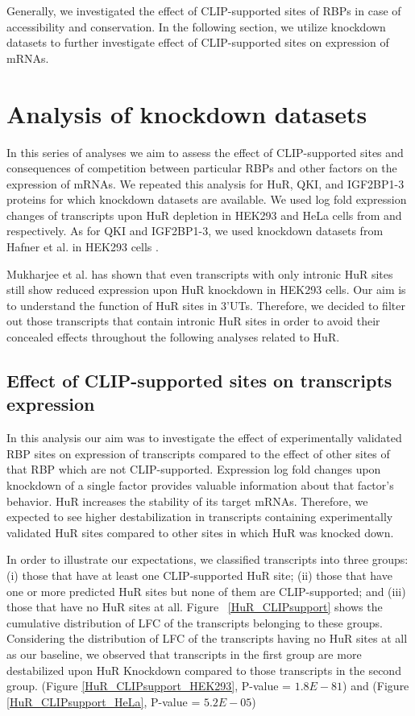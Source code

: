 Generally, we investigated the effect of CLIP-supported sites of RBPs in case of accessibility and conservation. In the following section, we utilize knockdown datasets to further investigate effect of CLIP-supported sites on expression of mRNAs.

\section{Analysis of knockdown datasets}

In this series of analyses we aim to assess the effect of CLIP-supported sites and consequences of competition between particular RBPs and other factors on the expression of mRNAs. We repeated this analysis for HuR, QKI, and IGF2BP1-3 proteins for which knockdown datasets are available. We used log fold expression changes of transcripts upon HuR depletion in HEK293 and HeLa cells from \cite{mukharjee_11} and \cite{lebedeva_11} respectively. As for QKI and IGF2BP1-3, we used knockdown datasets from Hafner et al. in HEK293 cells \cite{hafner_10}.

Mukharjee et al. \cite{mukharjee_11} has shown that even transcripts with only intronic HuR sites still show reduced expression upon HuR knockdown in HEK293 cells. Our aim is to understand the function of HuR sites in 3'UTs. Therefore, we decided to filter out those transcripts that contain intronic HuR sites in order to avoid their concealed effects throughout the following analyses related to HuR.

\subsection{Effect of CLIP-supported sites on transcripts expression}
 
In this analysis our aim was to investigate the effect of experimentally validated RBP sites on expression of transcripts compared to the effect of other sites of that RBP which are not CLIP-supported. Expression log fold changes upon knockdown of a single factor provides valuable information about that factor's behavior. HuR increases the stability of its target mRNAs. Therefore, we expected to see higher destabilization in transcripts containing experimentally validated HuR sites compared to other sites in which HuR was knocked down.

In order to illustrate our expectations, we classified transcripts into three groups: (i) those that have at least one CLIP-supported HuR site; (ii) those that have one or more predicted HuR sites but none of them are CLIP-supported; and (iii) those that have no HuR sites at all. Figure ~\ref{HuR_CLIPsupport} shows the cumulative distribution of LFC of the transcripts belonging to these groups. Considering the distribution of LFC of the transcripts having no HuR sites at all as our baseline, we observed that transcripts in the first group are more destabilized upon HuR Knockdown compared to those transcripts in the second group. (Figure \ref{HuR_CLIPsupport_HEK293}, P-value = $1.8E-81$) and  (Figure \ref{HuR_CLIPsupport_HeLa}, P-value = $5.2E-05$)

